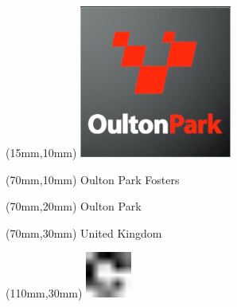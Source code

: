 \null\newpage
\begin{textblock*}{50mm}(15mm,10mm)%
\includegraphics[width=50mm]{LG/2015-05-20_00091.png}
\end{textblock*}
\begin{textblock*}{130mm}(70mm,10mm)%
{\fontsize{20}{20}\selectfont Oulton Park Fosters}\\
\end{textblock*}
\begin{textblock*}{120mm}(70mm,20mm)%
{\fontsize{16}{16}\selectfont Oulton Park}\\
\end{textblock*}
\begin{textblock*}{120mm}(70mm,30mm)%
{\fontsize{12}{12}\selectfont United Kingdom}
\end{textblock*}
\begin{textblock*}{30mm}(110mm,30mm)%
\centering
\includegraphics[height=15mm]{icons/fa-rotate-right.pdf}
\end{textblock*}
